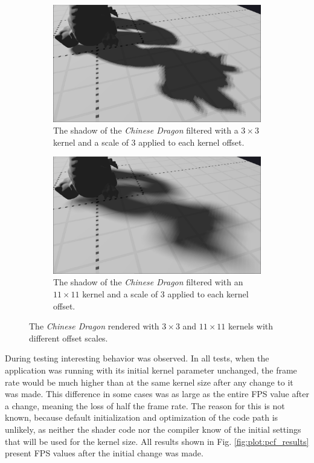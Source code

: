 \begin{figure}[p]
    \begin{subfigure}[t]{0.48\textwidth}
		\centering
        \includegraphics[width=\textwidth]{./graf/tests/pcf/cropped/dragon_pcf_fhd_1024_3x3_offset3.png}
        \caption{The shadow of the \textit{Chinese Dragon} filtered with a \(3\times 3\) kernel and a scale of \(3\) applied to each kernel offset.}
    \end{subfigure}
	\hfill
    \begin{subfigure}[t]{0.48\textwidth}
		\centering
        \includegraphics[width=\textwidth]{./graf/tests/pcf/cropped/dragon_pcf_fhd_1024_11x11_offset3.png}
        \caption{The shadow of the \textit{Chinese Dragon} filtered with an \(11\times 11\) kernel and a scale of \(3\) applied to each kernel offset.}
    \end{subfigure}    

    \caption{The \textit{Chinese Dragon} rendered with \(3\times 3\) and \(11\times 11\) kernels with different offset scales.}
    \label{fig:test_pcf_dragon_screens}
\end{figure}

During testing interesting behavior was observed. In all tests, when the application was running with its initial kernel parameter unchanged, the frame rate would be much higher than at the same kernel size after any change to it was made. This difference in some cases was as large as the entire FPS value after a change, meaning the loss of half the frame rate. The reason for this is not known, because default initialization and optimization of the code path is unlikely, as neither the shader code nor the compiler know of the initial settings that will be used for the kernel size. All results shown in Fig. \ref{fig:plot:pcf_results} present FPS values after the initial change was made.

